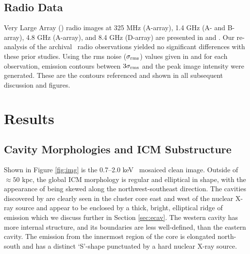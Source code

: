 \documentclass[apjpt4]{aastex}
\begin{document}
\subsection{Radio Data}
\label{sec:radio}

Very Large Array (\vla) radio images at 325 MHz (A-array), 1.4 GHz (A-
and B-array), 4.8 GHz (A-array), and 8.4 GHz (D-array) are presented
in \citet{gitti06} and \citet{birzan08}. Our re-analysis of the
archival \vla\ radio observations yielded no significant differences
with these prior studies. Using the rms noise ($\sigma_{\rm{rms}}$)
values given in \citet{gitti06} and \citet{birzan08} for each
observation, emission contours between $3\sigma_{\rm{rms}}$ and the
peak image intensity were generated. These are the contours referenced
and shown in all subsequent discussion and figures.

\section{Results}
\label{sec:results}

\subsection{Cavity Morphologies and ICM Substructure}
\label{sec:morph}

Shown in Figure \ref{fig:img} is the 0.7--2.0 keV \cxo\ mosaiced clean
image. Outside of $\approx 50$ kpc, the global ICM morphology is
regular and elliptical in shape, with the appearance of being skewed
along the northwest-southeast direction. The cavities discovered by
\citet{schindler01} are clearly seen in the cluster core east and west
of the nuclear X-ray source and appear to be enclosed by a thick,
bright, elliptical ridge of emission which we discuss further in
Section \ref{sec:ecav}. The western cavity has more internal
structure, and its boundaries are less well-defined, than the eastern
cavity. The emission from the innermost region of the core is
elongated north-south and has a distinct `S'-shape punctuated by a
hard nuclear X-ray source.
\end{document}
